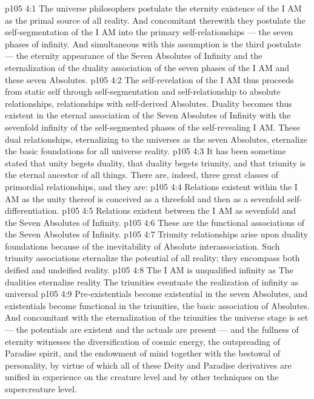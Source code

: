 \vs p105 4:1 The universe philosophers postulate the eternity existence of the I AM as the primal source of all reality. And concomitant therewith they postulate the self\hyp{}segmentation of the I AM into the primary self\hyp{}relationships --- the seven phases of infinity. And simultaneous with this assumption is the third postulate --- the eternity appearance of the Seven Absolutes of Infinity and the eternalization of the duality association of the seven phases of the I AM and these seven Absolutes.
\vs p105 4:2 The self\hyp{}revelation of the I AM thus proceeds from static self through self\hyp{}segmentation and self\hyp{}relationship to absolute relationships, relationships with self\hyp{}derived Absolutes. Duality becomes thus existent in the eternal association of the Seven Absolutes of Infinity with the sevenfold infinity of the self\hyp{}segmented phases of the self\hyp{}revealing I AM. These dual relationships, eternalizing to the universes as the seven Absolutes, eternalize the basic foundations for all universe reality.
\vs p105 4:3 It has been sometime stated that unity begets duality, that duality begets triunity, and that triunity is the eternal ancestor of all things. There are, indeed, three great classes of primordial relationships, and they are:
\vs p105 4:4 \bibnobreakspace {} Relations existent within the I AM as the unity thereof is conceived as a threefold and then as a sevenfold self\hyp{}differentiation.
\vs p105 4:5 \bibnobreakspace {} Relations existent between the I AM as sevenfold and the Seven Absolutes of Infinity.
\vs p105 4:6 \bibnobreakspace {} These are the functional associations of the Seven Absolutes of Infinity.
\vs p105 4:7 \pc Triunity relationships arise upon duality foundations because of the inevitability of Absolute interassociation. Such triunity associations eternalize the potential of all reality; they encompass both deified and undeified reality.
\vs p105 4:8 The I AM is unqualified infinity as  The dualities eternalize reality  The triunities eventuate the realization of infinity as universal 
\vs p105 4:9 Pre\hyp{}existentials become existential in the seven Absolutes, and existentials become functional in the triunities, the basic association of Absolutes. And concomitant with the eternalization of the triunities the universe stage is set --- the potentials are existent and the actuals are present --- and the fullness of eternity witnesses the diversification of cosmic energy, the outspreading of Paradise spirit, and the endowment of mind together with the bestowal of personality, by virtue of which all of these Deity and Paradise derivatives are unified in experience on the creature level and by other techniques on the supercreature level.
